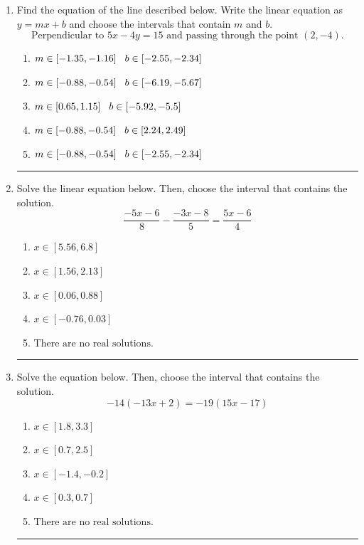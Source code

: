 \documentclass[14pt]{extbook}
\newcommand{\litem}[1]{\item#1\hspace*{-1cm}\rule{\textwidth}{0.4pt}}
\begin{document}
\begin{enumerate}
\litem{
Find the equation of the line described below. Write the linear equation as $ y=mx+b $ and choose the intervals that contain $m$ and $b$.\[ \text{Perpendicular to } 5 x - 4 y = 15 \text{ and passing through the point } (2, -4). \]\begin{enumerate}[label=\Alph*.]
\item \( m \in [-1.35, -1.16] \hspace*{3mm} b \in [-2.55, -2.34] \)
\item \( m \in [-0.88, -0.54] \hspace*{3mm} b \in [-6.19, -5.67] \)
\item \( m \in [0.65, 1.15] \hspace*{3mm} b \in [-5.92, -5.5] \)
\item \( m \in [-0.88, -0.54] \hspace*{3mm} b \in [2.24, 2.49] \)
\item \( m \in [-0.88, -0.54] \hspace*{3mm} b \in [-2.55, -2.34] \)

\end{enumerate} }
\litem{
Solve the linear equation below. Then, choose the interval that contains the solution.\[ \frac{-5x -6}{8} - \frac{-3x -8}{5} = \frac{5x -6}{4} \]\begin{enumerate}[label=\Alph*.]
\item \( x \in [5.56, 6.8] \)
\item \( x \in [1.56, 2.13] \)
\item \( x \in [0.06, 0.88] \)
\item \( x \in [-0.76, 0.03] \)
\item \( \text{There are no real solutions.} \)

\end{enumerate} }
\litem{
Solve the equation below. Then, choose the interval that contains the solution.\[ -14(-13x + 2) = -19(15x -17) \]\begin{enumerate}[label=\Alph*.]
\item \( x \in [1.8, 3.3] \)
\item \( x \in [0.7, 2.5] \)
\item \( x \in [-1.4, -0.2] \)
\item \( x \in [0.3, 0.7] \)
\item \( \text{There are no real solutions.} \)


\end{enumerate}}
\end{enumerate}
\end{document}
